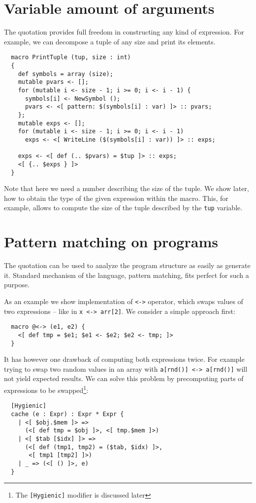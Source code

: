 \documentclass{llncs}
\begin{document}
\section{Variable amount of arguments}
The quotation provides full freedom in constructing any kind of expression.
For example, we can decompose a tuple of any size and print its elements.

\newpage
\begin{verbatim}
  macro PrintTuple (tup, size : int)
  {
    def symbols = array (size);
    mutable pvars <- [];
    for (mutable i <- size - 1; i >= 0; i <- i - 1) {
      symbols[i] <- NewSymbol ();
      pvars <- <[ pattern: $(symbols[i] : var) ]> :: pvars;
    };
    mutable exps <- [];
    for (mutable i <- size - 1; i >= 0; i <- i - 1)
      exps <- <[ WriteLine ($(symbols[i] : var)) ]> :: exps;

    exps <- <[ def (.. $pvars) = $tup ]> :: exps;
    <[ {.. $exps } ]>
  }
\end{verbatim} %

Note that here we need a number describing the size of the tuple. We show later, 
how to obtain the type of the given expression within the macro. This, for 
example, allows to compute the size of the tuple described by the \verb,tup, variable.

\section{Pattern matching on programs}
The quotation can be used to analyze the program structure as easily as generate
it. Standard mechanism of the language, pattern matching, fits perfect
for such a purpose. 

As an example we show implementation of \verb,<->, operator, which swaps values
of two expressions -- like in \verb,x <-> arr[2],. We consider a simple approach first:

\begin{verbatim}
  macro @<-> (e1, e2) {
    <[ def tmp = $e1; $e1 <- $e2; $e2 <- tmp; ]>
  }
\end{verbatim}

It has however one drawback of computing both expressions twice. For example
trying to swap two random values in an array with \verb,a[rnd()] <-> a[rnd()],
will not yield expected results.
We can solve this problem by precomputing parts of expressions to be swapped\footnote{The 
{\tt [Hygienic]} modifier is discussed later}:

\begin{verbatim}
  [Hygienic]
  cache (e : Expr) : Expr * Expr {
    | <[ $obj.$mem ]> =>
      (<[ def tmp = $obj ]>, <[ tmp.$mem ]>)
    | <[ $tab [$idx] ]> =>
      (<[ def (tmp1, tmp2) = ($tab, $idx) ]>, 
       <[ tmp1 [tmp2] ]>)
    | _ => (<[ () ]>, e)
  }
\end{verbatim}
\end{document}
